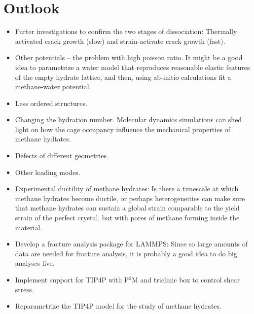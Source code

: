 \section{Outlook}
\begin{itemize}
\item Furter investigations to confirm the two stages of dissociation: Thermally activated crack growth (slow) and strain-activate crack growth (fast).
\item Other potentials – the problem with high poisson ratio. It might be a good idea to parametrize a water model that reproduces reasonable elastic features of the empty hydrate lattice, and then, using ab-initio calculations fit a methane-water potential.
\item Less ordered structures.
\item Changing the hydration number. Molecular dynamics simulations can shed light on how the cage occupancy influence the mechanical properties of methane hydtates.
\item Defects of different geometries.
\item Other loading modes.
\item Experimental ductility of methane hydrates: Is there a timescale at which methane hydrates become ductile, or perhaps heterogeneities can make sure that methane hydrates can sustain a global strain comparable to the yield strain of the perfect crystal, but with pores of methane forming inside the material. 
\item Develop a fracture analysis package for LAMMPS: Since so large amounts of data are needed for fracture analysis, it is probably a good idea to do big analyses live.
\item Implement support for TIP4P with P$^3$M and triclinic box to control shear stress.
\item Reparametrize the TIP4P model for the study of methane hydrates.
\end{itemize}